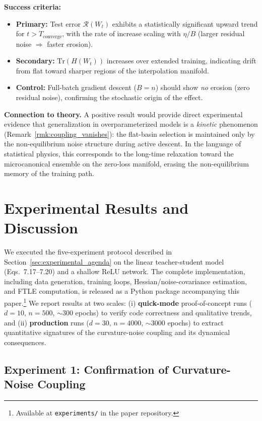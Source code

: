 \documentclass[
  journal=largetwo,
  year=2025,
  volume=37,
]{cup-journal}
\begin{document}
\textbf{Success criteria:}
\begin{itemize}
    \item \textbf{Primary:} Test error $\mathcal{R}(W_t)$ exhibits a statistically significant upward trend for $t > T_{\mathrm{converge}}$, with the rate of increase scaling with $\eta / B$ (larger residual noise $\Rightarrow$ faster erosion).
    \item \textbf{Secondary:} $\mathrm{Tr}(H(W_t))$ increases over extended training, indicating drift from flat toward sharper regions of the interpolation manifold.
    \item \textbf{Control:} Full-batch gradient descent ($B = n$) should show \emph{no} erosion (zero residual noise), confirming the stochastic origin of the effect.
\end{itemize}

\textbf{Connection to theory.}
A positive result would provide direct experimental evidence that generalization in overparameterized models is a \emph{kinetic} phenomenon (Remark~\ref{rmk:coupling_vanishes}): the flat-basin selection is maintained only by the non-equilibrium noise structure during active descent. In the language of statistical physics, this corresponds to the long-time relaxation toward the microcanonical ensemble on the zero-loss manifold, erasing the non-equilibrium memory of the training path.

\newpage
\section{Experimental Results and Discussion}\label{sec:results}

We executed the five-experiment protocol described in Section~\ref{sec:experimental_agenda} on the linear teacher-student model (Eqs.\ 7.17--7.20) and a shallow ReLU network. The complete implementation, including data generation, training loops, Hessian/noise-covariance estimation, and FTLE computation, is released as a Python package accompanying this paper.\footnote{Available at \texttt{experiments/} in the paper repository.} We report results at two scales: (i) \textbf{quick-mode} proof-of-concept runs ($d=10$, $n=500$, $\sim$300 epochs) to verify code correctness and qualitative trends, and (ii) \textbf{production} runs ($d=30$, $n=4000$, $\sim$3000 epochs) to extract quantitative signatures of the curvature-noise coupling and its dynamical consequences.

\subsection{Experiment 1: Confirmation of Curvature-Noise Coupling}
\end{document}
